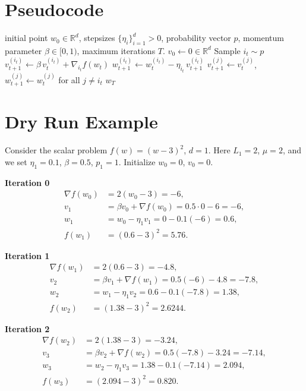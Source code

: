 \documentclass{article}
\newcommand{\R}{\mathbb{R}}
\begin{document}
\section*{Pseudocode}
\begin{algorithm}[H]
\caption{SACDM}
\begin{algorithmic}[1]
\REQUIRE initial point $w_{0}\in\R^{d}$, stepsizes $\{\eta_i\}_{i=1}^{d}>0$, 
probability vector $p$, momentum parameter $\beta\in[0,1)$, 
maximum iterations $T$.
\STATE $v_{0}\gets 0\in\R^{d}$
    \STATE Sample $i_t\sim p$ 
    \STATE $v_{t+1}^{(i_t)}\gets \beta\,v_{t}^{(i_t)}+\nabla_{i_t} f(w_t)$
    \STATE $w_{t+1}^{(i_t)}\gets w_{t}^{(i_t)}-\eta_{i_t}\,v_{t+1}^{(i_t)}$
    \STATE $v_{t+1}^{(j)}\gets v_{t}^{(j)}$, $w_{t+1}^{(j)}\gets w_{t}^{(j)}$ for all $j\neq i_t$
\ENDFOR
\RETURN $w_T$
\end{algorithmic}
\end{algorithm}

\section*{Dry Run Example}
Consider the scalar problem $f(w)=(w-3)^{2}$, $d=1$.  
Here $L_1=2$, $\mu=2$, and we set $\eta_1=0.1$, $\beta=0.5$, $p_1=1$.  
Initialize $w_0=0$, $v_0=0$.

\medskip
\noindent\textbf{Iteration 0}
\begin{align*}
\nabla f(w_0)&=2(w_0-3)=-6,\\
v_{1}&=\beta v_0+\nabla f(w_0)=0.5\cdot0-6=-6,\\
w_{1}&=w_0-\eta_1 v_{1}=0-0.1(-6)=0.6,\\
f(w_{1})&=(0.6-3)^{2}=5.76.
\end{align*}

\noindent\textbf{Iteration 1}
\begin{align*}
\nabla f(w_1)&=2(0.6-3)=-4.8,\\
v_{2}&=\beta v_{1}+\nabla f(w_1)=0.5(-6)-4.8=-7.8,\\
w_{2}&=w_1-\eta_1 v_{2}=0.6-0.1(-7.8)=1.38,\\
f(w_{2})&=(1.38-3)^{2}=2.6244.
\end{align*}

\noindent\textbf{Iteration 2}
\begin{align*}
\nabla f(w_2)&=2(1.38-3)=-3.24,\\
v_{3}&=\beta v_{2}+\nabla f(w_2)=0.5(-7.8)-3.24=-7.14,\\
w_{3}&=w_2-\eta_1 v_{3}=1.38-0.1(-7.14)=2.094,\\
f(w_{3})&=(2.094-3)^{2}=0.820.
\end{align*}
\end{document}

